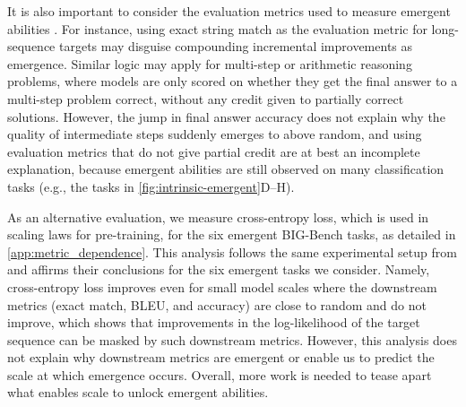\documentclass[10pt]{article} %
\begin{document}
It is also important to consider the evaluation metrics used to measure emergent abilities \citep{bigbench}.
For instance, using exact string match as the evaluation metric for long-sequence targets may disguise compounding incremental improvements as emergence.
Similar logic may apply for multi-step or arithmetic reasoning problems, where models are only scored on whether they get the final answer to a multi-step problem correct, without any credit given to partially correct solutions.
However, the jump in final answer accuracy does not explain why the quality of intermediate steps suddenly emerges to above random, and using evaluation metrics that do not give partial credit are at best an incomplete explanation, because emergent abilities are still observed on many classification tasks (e.g., the tasks in \cref{fig:intrinsic-emergent}D--H).

As an alternative evaluation, we measure cross-entropy loss, which is used in scaling laws for pre-training, for the six emergent BIG-Bench tasks, as detailed in \cref{app:metric_dependence}.
This analysis follows the same experimental setup from \citet{bigbench} and affirms their conclusions for the six emergent tasks we consider.
Namely, cross-entropy loss improves even for small model scales where the downstream metrics (exact match, BLEU, and accuracy) are close to random and do not improve, which shows that improvements in the log-likelihood of the target sequence can be masked by such downstream metrics.
However, this analysis does not explain why downstream metrics are emergent or enable us to predict the scale at which emergence occurs.
Overall, more work is needed to tease apart what enables scale to unlock emergent abilities.
\end{document}
